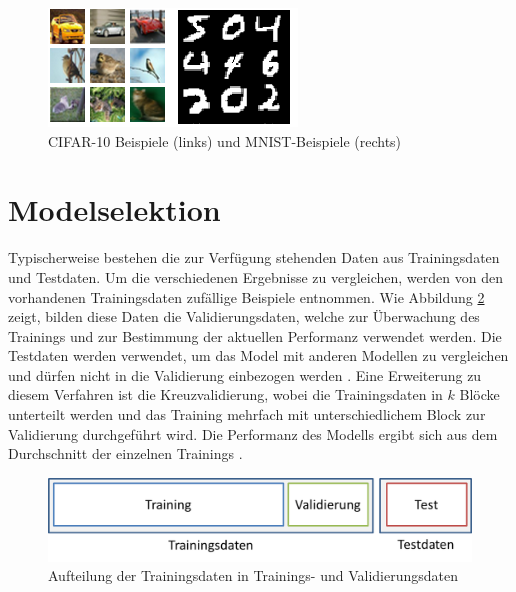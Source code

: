 \begin{figure}
\centering
\includegraphics[width=0.5\linewidth]{images/6_samples}
\caption[]{CIFAR-10 Beispiele (links) und MNIST-Beispiele (rechts)}
\label{fig:6_samples}
\end{figure}


\section{Modelselektion}
Typischerweise bestehen die zur Verfügung stehenden Daten aus Trainingsdaten und Testdaten.
Um die verschiedenen Ergebnisse zu vergleichen, werden von den vorhandenen Trainingsdaten zufällige Beispiele entnommen. Wie Abbildung \ref{fig:6_validationset} zeigt, bilden diese Daten die Validierungsdaten, welche zur Überwachung des Trainings und zur Bestimmung der aktuellen Performanz verwendet werden. Die Testdaten werden verwendet, um das Model mit anderen Modellen zu vergleichen und dürfen nicht in die Validierung einbezogen werden \cite[vgl. z. B.][S. 222]{Hastie2009}. Eine Erweiterung zu diesem Verfahren ist die Kreuzvalidierung, wobei die Trainingsdaten in $k$ Blöcke unterteilt werden und das Training mehrfach mit unterschiedlichem Block zur Validierung durchgeführt wird. Die Performanz des Modells ergibt sich aus dem Durchschnitt der einzelnen Trainings \cite[vgl. z. B.][Kap. 7.2, S. 219]{Bengio2015}.  

\begin{figure}[H]
\centering
\includegraphics[width=0.6\linewidth]{images/6_validationset}
\caption[]{Aufteilung der Trainingsdaten in Trainings- und Validierungsdaten}
\label{fig:6_validationset}
\end{figure}

